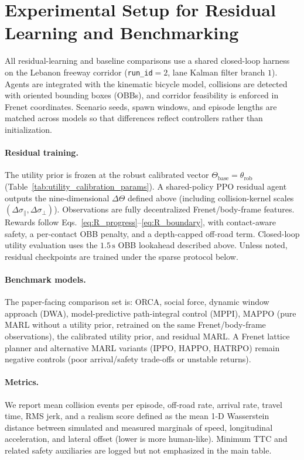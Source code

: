 \documentclass[conference]{IEEEtran}
\begin{document}
\section{Experimental Setup for Residual Learning and Benchmarking}
\label{sec:rl_setup}

All residual-learning and baseline comparisons use a shared closed-loop harness on the Lebanon freeway corridor (\texttt{run\_id}$=2$, lane Kalman filter branch $1$). Agents are integrated with the kinematic bicycle model, collisions are detected with oriented bounding boxes (OBBs), and corridor feasibility is enforced in Frenet coordinates. Scenario seeds, spawn windows, and episode lengths are matched across models so that differences reflect controllers rather than initialization.

\paragraph{Residual training.}
The utility prior is frozen at the robust calibrated vector $\Theta_{\mathrm{base}}=\theta_{\mathrm{rob}}$ (Table~\ref{tab:utility_calibration_params}). A shared-policy PPO residual agent outputs the nine-dimensional $\Delta\Theta$ defined above (including collision-kernel scales $(\Delta\sigma_{\parallel},\Delta\sigma_{\perp})$). Observations are fully decentralized Frenet/body-frame features. Rewards follow Eqs.~\eqref{eq:R_progress}--\eqref{eq:R_boundary}, with contact-aware safety, a per-contact OBB penalty, and a depth-capped off-road term. Closed-loop utility evaluation uses the $1.5\,\mathrm{s}$ OBB lookahead described above. Unless noted, residual checkpoints are trained under the sparse protocol below.

\paragraph{Benchmark models.}
The paper-facing comparison set is: ORCA, social force, dynamic window approach (DWA), model-predictive path-integral control (MPPI), MAPPO (pure MARL without a utility prior, retrained on the same Frenet/body-frame observations), the calibrated utility prior, and residual MARL. A Frenet lattice planner and alternative MARL variants (IPPO, HAPPO, HATRPO) remain negative controls (poor arrival/safety trade-offs or unstable returns).

\paragraph{Metrics.}
We report mean collision events per episode, off-road rate, arrival rate, travel time, RMS jerk, and a realism score defined as the mean 1-D Wasserstein distance between simulated and measured marginals of speed, longitudinal acceleration, and lateral offset (lower is more human-like). Minimum TTC and related safety auxiliaries are logged but not emphasized in the main table.
\end{document}
